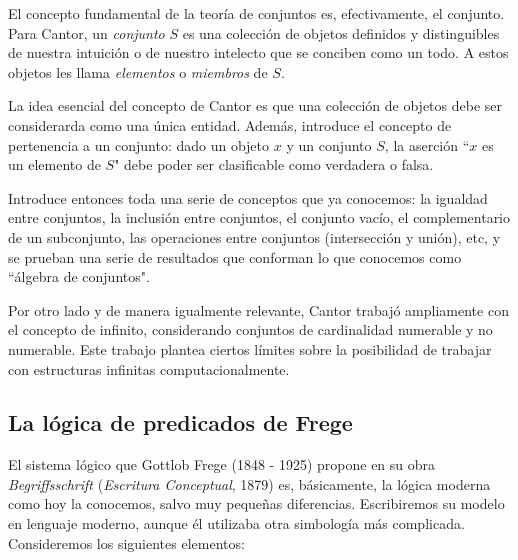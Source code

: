 \documentclass{article}
\begin{document}
El concepto fundamental de la teoría de conjuntos es, efectivamente, el conjunto. Para Cantor, un \textit{conjunto} $S$ es una colección de objetos definidos y distinguibles de nuestra intuición o de nuestro intelecto que se conciben como un todo. A estos objetos les llama \textit{elementos} o \textit{miembros} de $S$.

La idea esencial del concepto de Cantor es que una colección de objetos debe ser considerarda como una única entidad. Además, introduce el concepto de pertenencia a un conjunto: dado un objeto $x$ y un conjunto $S$, la aserción ``$x$ es un elemento de $S$" debe poder ser clasificable como verdadera o falsa.

Introduce entonces toda una serie de conceptos que ya conocemos: la igualdad entre conjuntos, la inclusión entre conjuntos, el conjunto vacío, el complementario de un subconjunto, las operaciones entre conjuntos (intersección y unión), etc, y se prueban una serie de resultados que conforman lo que conocemos como ``álgebra de conjuntos".

Por otro lado y de manera igualmente relevante, Cantor trabajó ampliamente con el concepto de infinito, considerando conjuntos de cardinalidad numerable y no numerable. Este trabajo plantea ciertos límites sobre la posibilidad de trabajar con estructuras infinitas computacionalmente\cite{stoll1979set}.

\subsection{La lógica de predicados de Frege}

El sistema lógico que Gottlob Frege (1848 - 1925) propone en su obra \textit{Begriffsschrift} (\textit{Escritura Conceptual}, 1879) es, básicamente, la lógica moderna como hoy la conocemos, salvo muy pequeñas diferencias. Escribiremos su modelo en lenguaje moderno, aunque él utilizaba otra simbología más complicada. Consideremos los siguientes elementos:
\end{document}
